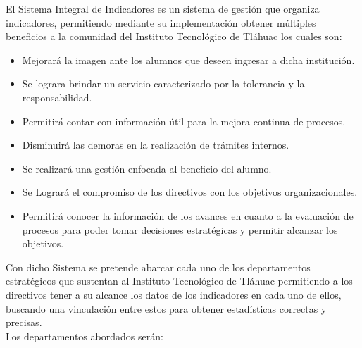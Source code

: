 	El Sistema Integral de Indicadores es un sistema de gesti\'on que organiza indicadores, permitiendo mediante su implementaci\'on obtener m\'ultiples beneficios a la comunidad del Instituto Tecnol\'ogico de Tl\'ahuac los cuales son:
	\begin{itemize}
		\item Mejorar\'a la imagen ante los alumnos que deseen ingresar a dicha instituci\'on.
		\item Se lograra brindar un servicio caracterizado por la tolerancia y la responsabilidad.
		\item Permitir\'a contar con informaci\'on \'util para la mejora continua de procesos.
		\item Disminuir\'a las demoras en la realizaci\'on de tr\'amites internos.
		\item Se realizar\'a una gesti\'on enfocada al beneficio del alumno.
		\item Se Lograr\'a el compromiso de los directivos con los objetivos organizacionales.
		\item Permitir\'a conocer la informaci\'on de los avances en cuanto a la evaluaci\'on de procesos para poder tomar decisiones  estrat\'egicas y permitir alcanzar los objetivos.
	\end{itemize}

	Con dicho Sistema se pretende abarcar cada uno de los departamentos estrat\'egicos que sustentan al Instituto Tecnol\'ogico de Tl\'ahuac permitiendo a los directivos tener a su alcance los datos de los indicadores en cada uno de ellos, buscando una vinculaci\'on entre estos para obtener estad\'isticas correctas y precisas. \\
	
	Los departamentos abordados ser\'an:

